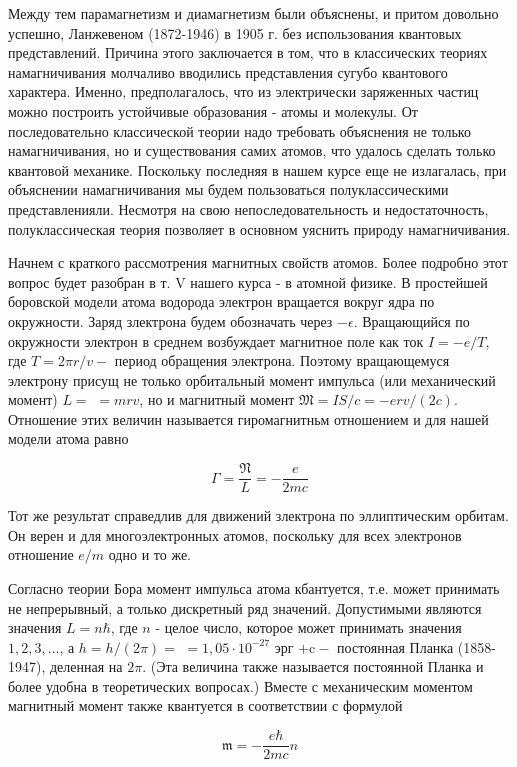 \documentclass[12pt]{article}
\begin{document}
  Между тем парамагнетизм и диамагнетизм были объяснены, и притом довольно успешно, Ланжевеном (1872-1946) в 1905 г. без использования квантовых представлений. Причина этого заключается в том, что в классических теориях намагничивания молчаливо вводились представления сугубо квантового характера. Именно, предполагалось, что из электрически заряженных частиц можно построить устойчивые образования - атомы и молекулы. От последовательно классической теории надо требовать объяснения не только намагничивания, но и существования самих атомов, что удалось сделать только квантовой механике. Поскольку последняя в нашем курсе еще не излагалась, при объяснении намагничивания мы будем пользоваться полуклассическими представленияли. Несмотря на свою непоследовательность и недостаточность, полуклассическая теория позволяет в основном уяснить природу намагничивания.

  Начнем с краткого рассмотрения магнитных свойств атомов. Более подробно этот вопрос будет разобран в т. V нашего курса - в атомной физике. В простейшей боровской модели атома водорода электрон вращается вокруг ядра по окружности. Заряд злектрона будем обозначать через $-\epsilon$. Вращающийся по окружности электрон в среднем возбуждает магнитное поле как ток $I=-e / T$, где $T=2 \pi r / v-$ период обращения электрона. Поэтому вращающемуся электрону присущ не только орбитальный момент импульса (или механический момент) $L=$ $=m r v$, но и магнитный момент $\mathfrak{M}=I S / c=-e r v /(2 c)$. Отношение этих величин называется гиромагнитньм отношением и для нашей модели атома равно

  $$
  \Gamma=\frac{\mathfrak{N}}{L}=-\frac{e}{2 m c}
  $$


  Тот же результат справедлив для движений злектрона по эллиптическим орбитам. Он верен и для многоэлектронных атомов, поскольку для всех электронов отношение $e / m$ одно и то же.

  Согласно теории Бора момент импульса атома кбантуется, т.е. может принимать не непрерывный, а только дискретный ряд значений. Допустимыми являются значения $L=n \hbar$, где $n$ - целое число, которое может принимать значения $1,2,3, \ldots$, а $h=h /(2 \pi)=$ $=1,05 \cdot 10^{-27}$ эрг $+\mathrm{c}-$ постоянная Планка (1858-1947), деленная на $2 \pi$. (Эта величина также называется постоянной Планка и более удобна в теоретических вопросах.) Вместе с механическим моментом магнитный момент также квантуется в соответствии с формулой

  $$
  \mathfrak{m}=-\frac{e \hbar}{2 m c} n
  $$
\end{document}
